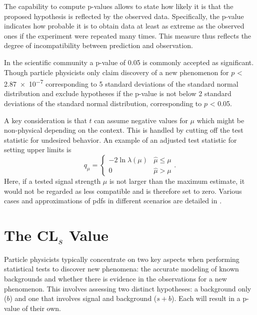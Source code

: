 The capability to compute p-values allows to state how likely it is that the proposed hypothesis is reflected by the observed data. Specifically, the p-value indicates how probable it is to obtain data at least as extreme as the observed ones if the experiment were repeated many times. This measure thus reflects the degree of incompatibility between prediction and observation.

In the scientific community a p-value of 0.05 is commonly accepted as significant. Though particle physicists only claim discovery of a new phenomenon for $p$ < \qty{2.87e-7}{} corresponding to 5 standard deviations of the standard normal distribution and exclude hypotheses if the p-value is not below 2 standard deviations of the standard normal distribution, corresponding to $p$ < \qty{0.05}{}. 

A key consideration is that $t$ can assume negative values for $\mu$ which might be non-physical depending on the context. This is handled by cutting off the test statistic for undesired behavior. An example of an adjusted test statistic for setting upper limits is
\begin{equation}
    q_\mu=
    \begin{cases}
        -2\ln \lambda(\mu) & \hat{\mu}\leq\mu \\
        0                  & \hat{\mu}> \mu
    \end{cases}.
\end{equation}
Here, if a tested signal strength $\mu$ is not larger than the maximum estimate, it would not be regarded as less compatible and is therefore set to zero. Various cases and approximations of \acp{pdf} in different scenarios are detailed in \citep{cowan2011asymptotic}.

\section{The CL$_s$ Value}\label{sec:cls}
Particle physicists typically concentrate on two key aspects when performing statistical tests to discover new phenomena: the accurate modeling of known backgrounds and whether there is evidence in the observations for a new phenomenon. This involves assessing two distinct hypotheses: a background only ($b$) and one that involves signal and background ($s+b$). Each will result in a p-value of their own.

